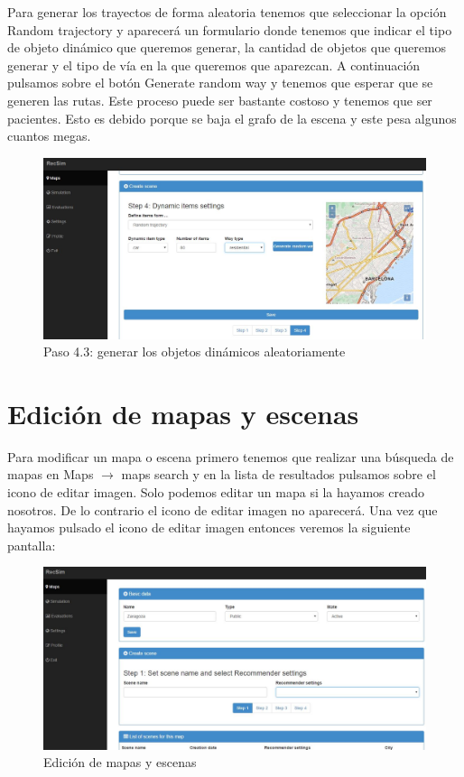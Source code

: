 Para generar los trayectos de forma aleatoria tenemos que seleccionar la opción Random trajectory y aparecerá un formulario donde tenemos que indicar el tipo de objeto dinámico que queremos generar, la cantidad de objetos que queremos generar y el tipo de vía en la que queremos que aparezcan. A continuación pulsamos sobre el botón Generate random way y tenemos que esperar que se generen las rutas. Este proceso puede ser bastante costoso y tenemos que ser pacientes. Esto es debido porque se baja el grafo de la escena y este pesa algunos cuantos megas.

\begin{figure}[H]
	\centering\includegraphics[scale=0.35]{imagenes/capitulo9/crear-escena-5.JPG}
	\caption{Paso 4.3: generar los objetos dinámicos aleatoriamente}
	\label{img:paso4-3}
\end{figure}

\section{Edición de mapas y escenas}\label{sec:editarMapasEscenas}

Para modificar un mapa o escena primero tenemos que realizar una búsqueda de mapas en Maps $\rightarrow$ maps search y en la lista de resultados pulsamos sobre el icono de editar imagen. Solo podemos editar un mapa si la hayamos creado nosotros. De lo contrario el icono de editar imagen no aparecerá. Una vez que hayamos pulsado el icono de editar imagen entonces veremos la siguiente pantalla:

\begin{figure}[H]
	\centering\includegraphics[scale=0.35]{imagenes/capitulo10/capitulo10.jpg}
	\caption{Edición de mapas y escenas}
	\label{img:UpdateMapScene}
\end{figure}

